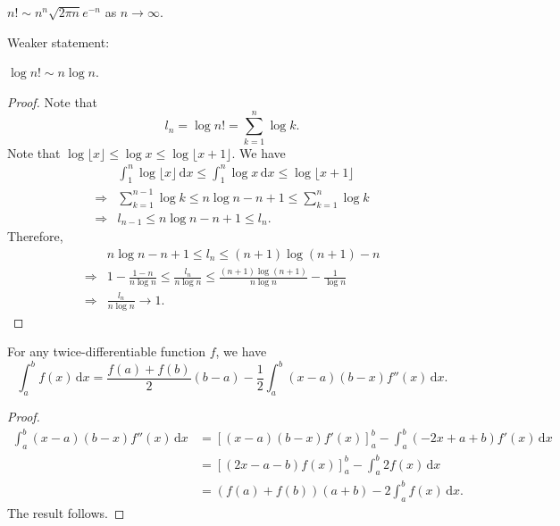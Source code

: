 \begin{theorem}[Stirling]\label{thm:stirling}
    $ n! \sim n^n \sqrt{2\pi n}e^{-n} $ as $n\to \infty$.
\end{theorem}

Weaker statement:
\begin{proposition}\label{prop:weak stirling}
    $ \log n! \sim n \log n $.
\end{proposition}
\begin{proof}
    Note that 
    \[
        l_n = \log n! = \sum_{k=1}^{n}\log k.
    \]
    Note that $ \log \lfloor x \rfloor \le \log x \le \log \lfloor x+1 \rfloor $. We have 
    \begin{align*}
        & \int_{1}^{n} \log \lfloor x \rfloor \,\mathrm{d}x \le \int_{1}^{n} \log x \,\mathrm{d}x \le \log \lfloor x+1 \rfloor\\ 
        \Longrightarrow & \sum_{k=1}^{n-1}\log k\le n\log n-n+1\le \sum_{k=1}^{n} \log k\\ 
        \Longrightarrow & l_{n-1}\le n\log n-n+1\le l_n.
    \end{align*}
    Therefore, 
    \begin{align*}
        &n\log n-n+1\le l_n\le (n+1) \log (n+1) -n \\ 
        \Longrightarrow& 1- \frac{1-n}{n\log n}\le \frac{l_n}{n\log n}\le \frac{(n+1) \log (n+1)}{n\log n}-\frac{1}{\log n}\\ 
        \Longrightarrow & \frac{l_n}{n\log n} \to 1.
    \end{align*}
\end{proof}

\begin{lemma}\label{lma:stirling1}
    For any twice-differentiable function $f$, we have 
    \[
        \int_{a}^{b} f(x) \,\mathrm{d}x = \frac{f(a)+f(b)}{2}(b-a) - \frac{1}{2} \int_{a}^{b} (x-a)(b-x)f''(x) \,\mathrm{d}x.
    \]
\end{lemma}

\begin{proof}
    \begin{align*}
        \int_{a}^{b} (x-a)(b-x)f''(x) \,\mathrm{d}x &= \left[ (x-a)(b-x)f'(x) \right]_{a}^{b} - \int_{a}^{b} (-2x+a+b) f'(x) \,\mathrm{d}x\\ 
        &= \left[ (2x-a-b)f(x) \right]_{a}^{b} - \int_{a}^{b} 2f(x) \,\mathrm{d}x\\ 
        &= (f(a)+f(b))(a+b) - 2 \int_{a}^{b} f(x) \,\mathrm{d}x.
    \end{align*}
    The result follows.
\end{proof}

